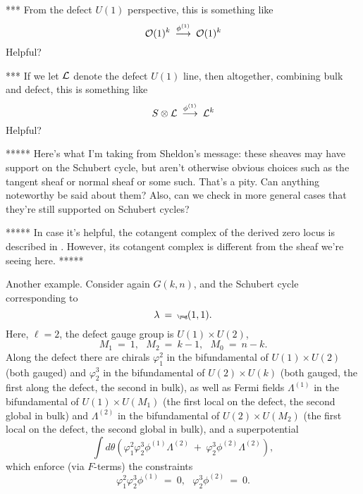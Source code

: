 \documentclass[12pt]{article}
\begin{document}
*** From the defect $U(1)$ perspective, this is something like
\begin{equation}
{\cal O}(1)^k \: \stackrel{\phi^{(1)}}{\longrightarrow} \:
{\cal O}(1)^k
\end{equation}
Helpful?

*** If we let ${\cal L}$ denote the defect $U(1)$ line, then altogether,
combining bulk and defect,
this is something like
\begin{equation}
S \otimes {\cal L} \: \stackrel{\phi^{(1)}}{\longrightarrow} \:
{\cal L}^k
\end{equation}
Helpful?

***** Here's what I'm taking from Sheldon's message:  these sheaves may have
support on the Schubert cycle, but aren't otherwise obvious choices such as
the tangent sheaf or normal sheaf or some such.  That's a pity.
Can anything noteworthy be said about them?  Also, can we check in more
general cases that they're still supported on Schubert cycles?

***** In case it's helpful, the cotangent complex of the derived zero
locus is described in
\cite[section 4.1]{Sharpe:2019yag}.
However, its cotangent complex is different from the sheaf
we're seeing here.
*****


Another example.  Consider again $G(k,n)$, and the Schubert cycle corresponding
to
\begin{equation}
\lambda \: = \: \tiny\yng(1,1).
\end{equation}
Here, $\ell=2$, the defect gauge group is $U(1) \times U(2)$,
\begin{equation}
M_1 \: = \: 1, \: \: \:
M_2 \: = \: k-1, \: \: \:
M_0 \: = \: n-k.
\end{equation}
Along the defect there are chirals $\varphi_1^2$ in the bifundamental
of $U(1) \times U(2)$ (both gauged) and $\varphi_2^3$ in the
bifundamental of $U(2) \times U(k)$ (both gauged, the first along the
defect, the second in bulk), as well as Fermi fields
$\Lambda^{(1)}$ in the bifundamental of $U(1) \times U(M_1)$
(the first local on the defect, the second global in bulk)
and $\Lambda^{(2)}$ in the bifundamental of $U(2) \times U(M_2)$
(the first local on the defect, the second global in bulk),
and a superpotential
\begin{equation}
\int d \theta \left( \varphi_1^2 \varphi_2^3 \phi^{(1)} \Lambda^{(2)} \: + \:
\varphi_2^3 \phi^{(2)} \Lambda^{(2)} \right),
\end{equation}
which enforce (via $F$-terms) the constraints
\begin{equation}
\varphi_1^2 \varphi_2^3 \phi^{(1)} \: = \: 0, \: \: \:
\varphi_2^3 \phi^{(2)} \: = \: 0.
\end{equation}
\end{document}
